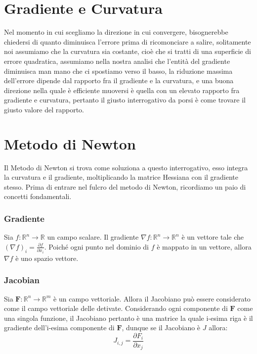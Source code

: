 \section{Gradiente e Curvatura}
Nel momento in cui scegliamo la direzione in cui convergere, bisognerebbe chiedersi di quanto diminuisca l'errore prima di ricomonciare a salire, solitamente noi assumiamo che la curvatura sia costante, cioè che si tratti di una superficie di errore quadratica, assumiamo nella nostra analisi che l'entità del gradiente diminuisca man mano che ci spostiamo verso il basso, la riduzione massima dell'errore dipende dal rapporto fra il gradiente e la curvatura, e una buona direzione nella quale è efficiente muoversi è quella con un elevato rapporto fra gradiente e curvatura, pertanto il giusto interrogativo da porsi è come trovare il giusto valore del rapporto.

\section{Metodo di Newton}
Il Metodo di Newton si trova come soluziona a questo interrogativo, esso integra la curvatura e il gradiente, moltiplicando la matrice Hessiana con il gradiente stesso. Prima di entrare nel fulcro del metodo di Newton, ricordiamo un paio di concetti fondamentali.

\subsubsection{Gradiente}
Sia $f:\mathbb{R}^n \rightarrow \mathbb{R}$ un campo scalare. Il gradiente $\nabla f:\mathbb{R}^n \rightarrow \mathbb{R}^n$ è un vettore tale che $(\nabla f)_i = \frac{\partial f}{\partial x_i}$. Poiché ogni punto nel dominio di $f$ è mappato in un vettore, allora $\nabla f$ è uno spazio vettore.

\subsubsection{Jacobian}
Sia $\mathbf{F}:\mathbb{R}^n \rightarrow \mathbb{R}^m$ è un campo vettoriale. Allora il Jacobiano può essere considerato come il campo vettoriale delle detivate. Considerando ogni componente di $\mathbf{F}$ come una singola funzione, il Jacobiano pertanto è una matrice la quale i-esima riga è il gradiente dell'i-esima componente di $\mathbf{F}$, dunque se il Jacobiano è $J$ allora:
\begin{equation}
    J_{i,j} = \frac{\partial F_i}{\partial x_j}
\end{equation}


